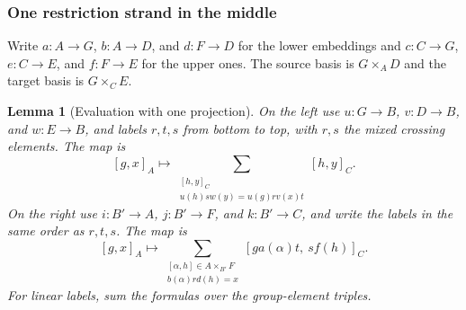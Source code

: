 \documentclass[11pt,a4paper]{article}
\numberwithin{equation}{section}
\newtheorem{lemma}[theorem]{Lemma}
\theoremstyle{definition}
\newcommand{\mixedThreeWires}[3]{%
  \draw[#1] (0,0)--(0,.26)
    .. controls (0,.73) and (1.4,.91) .. (1.4,1.45)
    --(1.4,1.79)
    .. controls (1.4,2.33) and (2.8,2.47) .. (2.8,3.01)
    --(2.8,4.8);
  \draw[#2] (1.4,0)--(1.4,.26)
    .. controls (1.4,.73) and (0,.91) .. (0,1.45)
    --(0,3.35)
    .. controls (0,3.89) and (1.4,4.03) .. (1.4,4.57)
    --(1.4,4.8);
  \draw[#3] (2.8,0)--(2.8,1.79)
    .. controls (2.8,2.33) and (1.4,2.47) .. (1.4,3.01)
    --(1.4,3.35)
    .. controls (1.4,3.89) and (0,4.03) .. (0,4.57)
    --(0,4.8);
}
\newcommand{\mixedThreeLeft}{%
  \foreach \x/\y/\i/\offset in {.7/.82875/1/-.43,2.1/2.4/2/.43,.7/3.96/3/-.43}{
    \fill (\x,\y) circle (1.9pt);
    \node[strandlabel] at ({\x+\offset},\y) {$x_{\i}$};
  }
  \node[region] at (.69,2.4) {$B$};
}
\newcommand{\mixedThreeRight}{%
  \foreach \x/\y/\i/\offset in {2.1/.82875/1/.43,.7/2.4/2/-.43,2.1/3.96/3/.43}{
    \fill (\x,\y) circle (1.9pt);
    \node[strandlabel] at ({\x+\offset},\y) {$y_{\i}$};
  }
  \node[region] at (2.11,2.4) {$B'$};
}
\newcommand{\mixedThreeBoundary}[7]{%
  \node[region] at (-.48,2.4) {$G$};
  \node[region] at (3.28,2.4) {$F$};
  \node[region] at (.70,.18) {$#1$};
  \node[region] at (2.10,.18) {$#2$};
  \node[region] at (.70,4.60) {$#3$};
  \node[region] at (2.10,4.60) {$#4$};
  \foreach \x/\lab in {#5} {\node[strandlabel] at (\x,-.35) {$\bar\lab$};}
  \foreach \x/\lab in {#6} {\node[strandlabel] at (\x,5.15) {$\bar\lab$};}
  \node[font=\normalsize] at (1.4,-.90) {Case #7};
}
\begin{document}
\subsubsection{One restriction strand in the middle}

\begin{center}
\end{center}

Write \(a:A\to G\), \(b:A\to D\), and \(d:F\to D\) for the lower
embeddings and \(c:C\to G\), \(e:C\to E\), and \(f:F\to E\) for the upper ones.
The source basis is \(G\times_A D\) and the target basis is \(G\times_C E\).

\begin{lemma}[Evaluation with one projection]\label{lem:three-middle-restriction}
On the left use \(u:G\to B\), \(v:D\to B\), and \(w:E\to B\),
and labels \(r,t,s\) from bottom to top, with \(r,s\) the mixed crossing elements.
The map is
\begin{equation}\label{eq:three-left-middle-restriction}
 [g,x]_A\longmapsto
 \sum_{\substack{[h,y]_C\\u(h)s w(y)=u(g)r v(x)t}}[h,y]_C .
\end{equation}
On the right use \(i:B'\to A\), \(j:B'\to F\), and \(k:B'\to C\),
and write the labels in the same order as \(r,t,s\). The map is
\begin{equation}\label{eq:three-right-middle-restriction}
 [g,x]_A\longmapsto
 \sum_{\substack{[\alpha,h]\in A\times_{B'}F\\ b(\alpha)r d(h)=x}}
       [ga(\alpha)t,\ s f(h)]_C .
\end{equation}
For linear labels, sum the formulas over the group-element triples.
\end{lemma}
\end{document}
